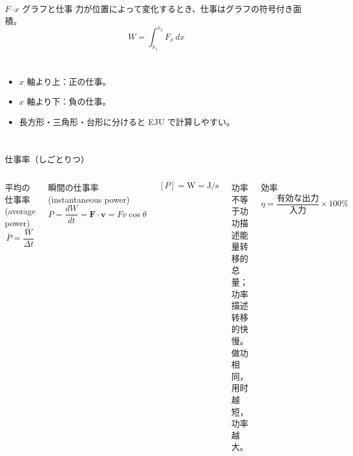 \documentclass[notheorems,aspectratio=169]{beamer}
\newcommand{\en}[1]{\textcolor{GraphGray}{\scriptsize(#1)}}
\newcommand{\vect}[1]{\bm{#1}}
\begin{document}
\begin{frame}{$F$--$x$ グラフと仕事}
  力が位置によって変化するとき、仕事はグラフの符号付き面積。
  \[
    \boxed{W=\int_{x_1}^{x_2}F_x\,dx}
  \]
  \begin{columns}[T,onlytextwidth]
    \centering
    \begin{itemize}
      \item $x$ 軸より上：正の仕事。
      \item $x$ 軸より下：負の仕事。
      \item 長方形・三角形・台形に分けると EJU で計算しやすい。
    \end{itemize}
  \end{columns}
\end{frame}

\begin{frame}{仕事率（しごとりつ）}
  \begin{columns}[T,onlytextwidth]
    \begin{block}{平均の仕事率 \en{average power}}
      \[
        \boxed{\overline P=\frac{W}{\Delta t}}
      \]
    \end{block}
    \begin{block}{瞬間の仕事率 \en{instantaneous power}}
      \[
        \boxed{P=\frac{dW}{dt}=\vect F\cdot\vect v
        =Fv\cos\theta}
      \]
    \end{block}
    \[
      [P]=\mathrm W=\mathrm{J/s}
    \]
    \begin{alertblock}{功率不等于功}
      功描述能量转移的总量；功率描述转移的快慢。
      做功相同，用时越短，功率越大。
    \end{alertblock}
    \begin{block}{効率}
      \[
        \eta=\frac{\text{有効な出力}}{\text{入力}}\times100\%
      \]
    \end{block}
  \end{columns}
\end{frame}
\end{document}
